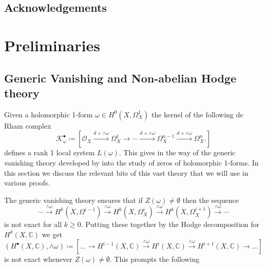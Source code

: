 \documentclass[12pt,reqno]{amsart}
\theoremstyle{question}
\theoremstyle{definition}
\newtheorem{definition}[theorem]{Definition}
\theoremstyle{remark}
\theoremstyle{cited}
\theoremstyle{citeddef}
\newcommand{\C}{\mathbb{C}}
\newcommand{\sK}{\mathcal{K}}
\newcommand{\sO}{\mathcal{O}}
\newcommand{\sZ}{\mathcal{Z}}
\newcommand{\bbC}{\mathbb{C}}
\begin{document}
\subsection*{Acknowledgements}



\section{Preliminaries}
\subsection{Generic Vanishing and Non-abelian Hodge theory}\label{sec:gv}
Given a holomorphic 1-form $\omega\in H^0(X,\Omega_X^1)$
the kernel of the following de Rham complex
\begin{equation}
\sK^{\bullet}_{\omega} \coloneqq [\sO_X\overset{d+\wedge\omega}{\to} \Omega_X^1 \to \cdots\overset{d+\wedge\omega}{\to}  \Omega_X^{n-1}\overset{d+\wedge\omega}{\to}  \Omega^n_X.]
\label{eq:koszul}
\end{equation}
defines a rank 1 local system $L(\omega)$. This gives in the way of the generic vanishing theory developed by \cite{GL, Ara, Sim} into the 
study of zeros of holomorphic 1-forms. In this section we discuss 
the relevant bits of this vast theory that we will use in various
proofs.
%
%

 
The generic vanishing theory 
\cite[Proposition 3.4]{GL} ensures that
if $Z(\omega)\neq \emptyset$ then the sequence
\[\cdots\overset{\wedge\omega}{\to} H^k(X, \Omega^{i-1})
\overset{\wedge\omega}{\to}H^k(X, \Omega_X^{i})
\overset{\wedge\omega}{\to} H^k(X,\Omega_X^{i+1})
\overset{\wedge\omega}{\to}\cdots\]
is not exact for all $k\geq 0$. Putting these together 
by the Hodge decomposition for $H^k(X,\bbC)$ we get
\begin{equation}
(H^{\bullet}(X,\bbC), \wedge\omega)\coloneqq [\ldots\to H^{i-1}(X,\C)\overset{\wedge\omega}{\longrightarrow}H^{i}(X,\C)\overset{\wedge\omega}{\longrightarrow}H^{i+1}(X,\C)\to\ldots]
\label{eq:resonance}
\end{equation}
is not exact whenever $Z(\omega)\neq \emptyset$. This prompts the following
\end{document}
